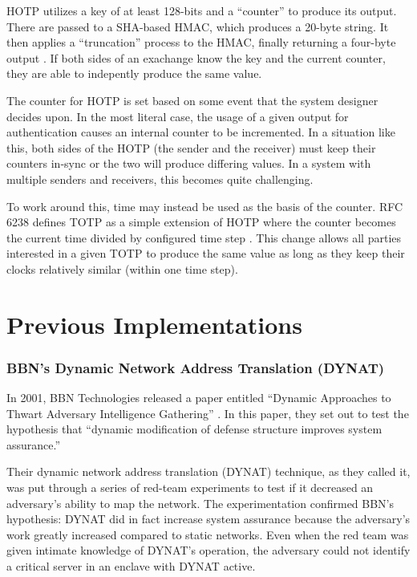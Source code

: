 \par \ac{HOTP} utilizes a key of at least 128-bits and a ``counter'' to produce its output. There are passed to a \ac{SHA}-based \ac{HMAC}, which produces a 20-byte string. It then applies a ``truncation'' process to the \ac{HMAC}, finally returning a four-byte output \cite{rfc4226}. If both sides of an exachange know the key and the current counter, they are able to indepently produce the same value.

\par The counter for HOTP is set based on some event that the system designer decides upon. In the most literal case, the usage of a given output for authentication causes an internal counter to be incremented. In a situation like this, both sides of the HOTP (the sender and the receiver) must keep their counters in-sync or the two will produce differing values. In a system with multiple senders and receivers, this becomes quite challenging.

\par To work around this, time may instead be used as the basis of the counter. RFC 6238 defines \ac{TOTP} as a simple extension of \ac{HOTP} where the counter becomes the current time divided by configured time step \cite{rfc6238}. This change allows all parties interested in a given \ac{TOTP} to produce the same value as long as they keep their clocks relatively similar (within one time step). 

\section{Previous Implementations}
\label{sec:related_research}


\subsubsection{BBN's Dynamic Network Address Translation (DYNAT)}
\par In 2001, BBN Technologies released a paper entitled ``Dynamic Approaches to Thwart Adversary Intelligence Gathering'' \cite{BBNDYNAT}. In this paper, they set out to test the hypothesis that ``dynamic modification of defense structure improves system assurance.''

\par Their dynamic network address translation (DYNAT) technique, as they called it, was put through a series of red-team experiments to test if it decreased an adversary's ability to map the network. The experimentation confirmed BBN's hypothesis: DYNAT did in fact increase system assurance because the adversary's work greatly increased compared to static networks. Even when the red team was given intimate knowledge of DYNAT's operation, the adversary could not identify a critical server in an enclave with DYNAT active.

